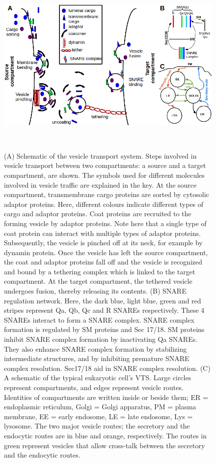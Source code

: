 \begin{figure}
  \begin{center}
	\includegraphics[height=9cm,width=12cm]{fig.png}
	\end{center}

	\caption{(A) Schematic of the vesicle transport system. Steps involved in vesicle transport between
		two compartments: a source and a target compartment, are shown. The symbols used for different
		molecules involved in vesicle traffic are explained in the key. At the source compartment,
		transmembrane cargo proteins are sorted by cytosolic adaptor proteins. Here, different colours
		indicate different types of cargo and adaptor proteins. Coat proteins are recruited to the forming
		vesicle by adaptor proteins. Note here that a single type of coat protein can interact with multiple
		types of adaptor proteins. Subsequently, the vesicle is pinched off at its neck, for example by dynamin
		protein. Once the vesicle has left the source compartment, the coat and adaptor proteins fall off and
		the vesicle is recognized and bound by a tethering complex which is linked to the target compartment.
		At the target compartment, the tethered vesicle undergoes fusion, thereby releasing its contents. (B)
		SNARE regulation network. Here, the dark blue, light blue, green and red stripes represent Qa, Qb,
		Qc and R SNAREs respectively. These 4 SNAREs interact to form a SNARE complex. SNARE
		complex formation is regulated by SM proteins and Sec 17/18. SM proteins inhibit SNARE complex
		formation by inactivating Qa SNAREs. They also enhance SNARE complex formation by stabilizing
		intermediate structures, and by inhibiting premature SNARE complex resolution. Sec17/18 aid in
		SNARE complex resolution. (C) A schematic of the typical eukaryotic cell's VTS. Large circles
		represent compartments, and edges represent vesicle routes. Identities of compartments are written
		inside or beside them; ER = endoplasmic reticulum, Golgi = Golgi apparatus, PM = plasma
		membrane, EE = early endosome, LE = late endosome, Lys = lysosome. The two major vesicle routes;
		the secretory and the endocytic routes are in blue and orange, respectively. The routes in green
		represent vesicles that allow cross-talk between the secretory and the endocytic routes. }
    \label{fig:vts}
\end{figure}

